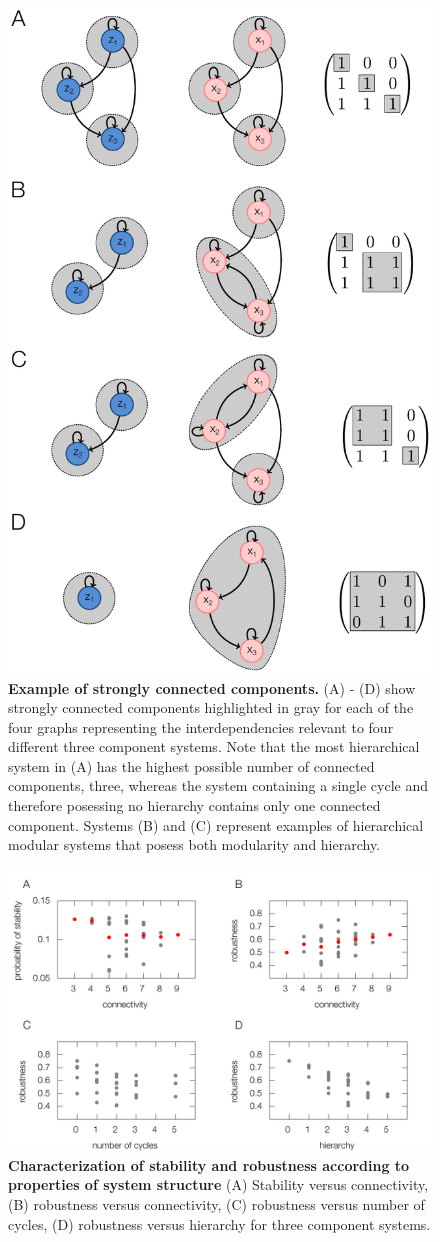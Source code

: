 \begin{figure}[!ht]
\centering
\noindent\includegraphics[width=0.4\columnwidth]{fig/scc2.pdf}
\caption{{\bf Example of strongly connected components.} (A) - (D) show strongly connected components highlighted in gray for each of the four graphs representing the interdependencies relevant to four different three component systems. Note that the most hierarchical system in (A) has the highest possible number of connected components, three, whereas the system containing a single cycle and therefore posessing no hierarchy contains only one connected component. Systems (B) and (C) represent examples of hierarchical modular systems that posess both modularity and hierarchy.}
\label{fig:scc}
\end{figure}

\pagebreak

\begin{figure}[!ht]
\centering
\noindent\includegraphics[width=1.0\columnwidth]{fig/combinedfigs.pdf}
\caption{{\bf Characterization of stability and robustness according to properties of system structure} (A) Stability versus connectivity, (B) robustness versus connectivity, (C) robustness versus number of cycles, (D) robustness versus hierarchy%
 for three component systems.
}
\label{fig:combined}
\end{figure}

